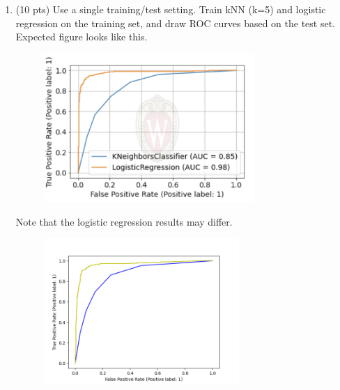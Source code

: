 \documentclass[a4paper]{article}
\theoremstyle{definition}
\newenvironment{soln}{
    \leavevmode\color{blue}\ignorespaces
}{}
\begin{document}
\begin{enumerate}
\begin{soln}
	      \end{soln}

	\item (10 pts) Use a single training/test setting. Train kNN (k=5) and logistic regression on the training set, and draw ROC curves based on the test set. \\
	      Expected figure looks like this.
	      \begin{figure}[h]
		      \centering
		      \includegraphics[width=8cm]{roc.png}
	      \end{figure}
	      Note that the logistic regression results may differ.

	      \begin{soln}
		      \begin{figure}[h!]
			      \centering
			      \includegraphics[width=0.7\textwidth]{../img/q2-5.png}
		      \end{figure}
	      \end{soln}

\end{enumerate}

\end{document}
